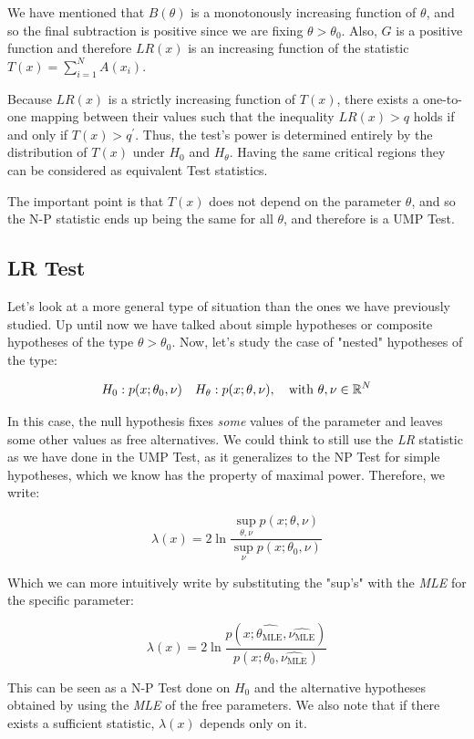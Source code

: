 We have mentioned that $B(\theta)$ is a monotonously increasing function of $\theta$, and so the final subtraction is positive since we are fixing $\theta>\theta_0$. Also, $G$ is a positive function and therefore $LR(x)$ is an increasing function of the statistic $T(x) = \sum_{i=1}^NA(x_i)$. 

Because $LR(x)$ is a strictly increasing function of $T(x)$, there exists a one-to-one mapping between their values such that the inequality $LR(x) > q$ holds if and only if $T(x) > q^\prime$. Thus, the test's power is determined entirely by the distribution of $T(x)$ under $H_0$ and $H_\theta$. Having the same critical regions they can be considered as equivalent Test statistics. 

The important point is that $T(x)$ does not depend on the parameter $\theta$, and so the N-P statistic ends up being the same for all $\theta$, and therefore is a UMP Test. 

\subsection{LR Test}
\label{subsec:LR_test}
Let's look at a more general type of situation than the ones we have previously studied. Up until now we have talked about simple hypotheses or composite hypotheses of the type $\theta>\theta_0$. Now, let's study the case of "nested" hypotheses of the type:

	\[
	H_0: p(x;\theta_0,\nu) \quad H_\theta: p(x;\theta, \nu), \quad \text{with }\theta,\nu\in\mathbb{R}^N
	\]

In this case, the null hypothesis fixes \emph{some} values of the parameter and leaves some other values as free alternatives. We could think to still use the \emph{LR} statistic as we have done in the UMP Test, as it generalizes to the NP Test for simple hypotheses, which we know has the property of maximal power. Therefore, we write:

	\[
	\lambda(x) = 2\ln \frac{\sup_{\theta,\nu}p(x;\theta,\nu)}{\sup_{\nu}p(x;\theta_0,\nu)}
	\]

Which we can more intuitively write by substituting the "sup's" with the \emph{MLE} for the specific parameter:

	\[
	\lambda(x) = 2\ln \frac{p(x;\hat{\theta_{\text{MLE}}},\hat{\nu_{\text{MLE}}})}{p(x;\theta_0,\hat{\nu_{\text{MLE}}})}
	\]

This can be seen as a N-P Test done on $H_0$ and the alternative hypotheses obtained by using the \emph{MLE} of the free parameters. We also note that if there exists a sufficient statistic, $\lambda(x)$ depends only on it.

